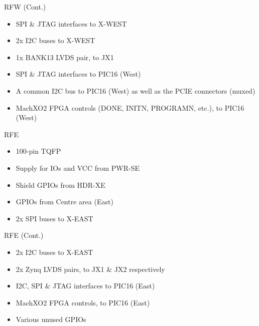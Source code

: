 \documentclass{beamer}
\begin{document}
\begin{frame}{RFW (Cont.)}
    \begin{itemize}
    \item SPI \& JTAG interfaces to X-WEST
    \item 2x I2C buses to X-WEST
    \item 1x BANK13 LVDS pair, to JX1
    \item SPI \& JTAG interfaces to PIC16 (West)
    \item A common I2C bus to PIC16 (West) as well as the PCIE connectors (muxed)
    \item MachXO2 FPGA controls (DONE, INITN, PROGRAMN, etc.), to PIC16 (West) 
    \end{itemize}
\end{frame}

\begin{frame}{RFE}
    \begin{itemize}
    \item 100-pin TQFP
    \item Supply for IOs and VCC from PWR-SE
    \item Shield GPIOs from HDR-XE 
    \item GPIOs from Centre area (East)
    \item 2x SPI buses to X-EAST
    \end{itemize}
\end{frame}

\begin{frame}{RFE (Cont.)}
    \begin{itemize}
    \item 2x I2C buses to X-EAST
    \item 2x Zynq LVDS pairs, to JX1 \& JX2 respectively
    \item I2C, SPI \& JTAG interfaces to PIC16 (East)
    \item MachXO2 FPGA controls, to PIC16 (East)
    \item Various unused GPIOs
    \end{itemize}
\end{frame}
\end{document}
